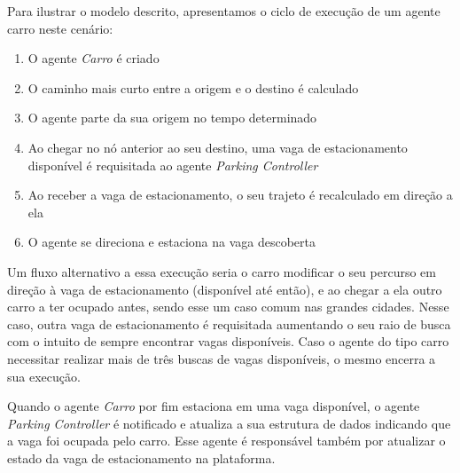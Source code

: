 Para ilustrar o modelo descrito, apresentamos o ciclo de execução de um agente carro neste cenário:

\begin{enumerate}
    \item O agente \textit{Carro} é criado

    \item O caminho mais curto entre a origem e o destino é calculado

    \item O agente parte da sua origem no tempo determinado

    \item Ao chegar no nó anterior ao seu destino, uma vaga de estacionamento disponível é requisitada ao agente \textit{Parking Controller}

    \item Ao receber a vaga de estacionamento, o seu trajeto é recalculado em direção a ela

    \item O agente se direciona e estaciona na vaga descoberta 
\end{enumerate}

Um fluxo alternativo a essa execução seria o carro modificar o seu percurso em direção à vaga de estacionamento (disponível até então), e ao chegar a ela outro
carro a ter ocupado antes, sendo esse um caso comum nas grandes cidades.
Nesse caso, outra vaga de estacionamento é requisitada aumentando o seu raio de busca com o intuito de sempre encontrar vagas disponíveis.
Caso o agente do tipo carro necessitar realizar mais de três buscas de vagas disponíveis, o mesmo encerra a sua execução.

Quando o agente \textit{Carro} por fim estaciona em uma vaga disponível, o agente \textit{Parking Controller} é notificado e atualiza a sua estrutura de dados indicando
que a vaga foi ocupada pelo carro.
Esse agente é responsável também por atualizar o estado da vaga de estacionamento na plataforma.

